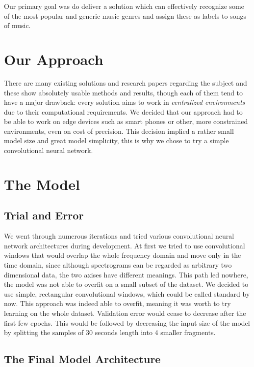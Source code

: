 \documentclass{article}
\begin{document}
Our primary goal was do deliver a solution which can effectively recognize some of the 
most popular and generic music genres and assign these as labels to songs of music. 

\section{Our Approach}

There are many existing solutions and research papers regarding the subject and these 
show absolutely usable methods and results, though each of them tend to have a major 
drawback: every solution aims to work in \emph{centralized environments} due to their 
computational requirements. We decided that our approach had to be able to work on 
edge devices such as smart phones or other, more constrained environments, even on 
cost of precision. This decision implied a rather small model size and great model 
simplicity, this is why we chose to try a simple convolutional neural network.    

\section{The Model}

\subsection{Trial and Error}

We went through numerous iterations and tried various convolutional neural 
network architectures during development. At first we tried to use convolutional 
windows that would overlap the whole frequency domain and move only in the time domain, 
since although spectrograms can be regarded as arbitrary two dimensional data, the two 
axises have different meanings. This path led nowhere, the model was not able to 
overfit on a small subset of the dataset. We decided to use simple, rectangular convolutional 
windows, which could be called standard by now. This approach was indeed able to overfit, meaning 
it was worth to try learning on the whole dataset. Validation error would cease to decrease 
after the first few epochs. This would be followed by decreasing the input size of the model 
by splitting the samples of 30 seconds length into 4 smaller fragments. 

\subsection{The Final Model Architecture}
\end{document}
